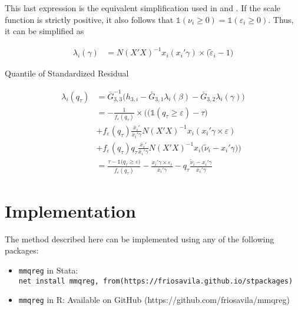 \documentclass[
  authoryear,
  review,
  1p]{elsarticle}
\providecommand{\tightlist}{%
  \setlength{\itemsep}{0pt}\setlength{\parskip}{0pt}}\usepackage{longtable,booktabs,array}
\begin{document}
This last expression is the equivalent simplification used in
\citet{mss2019} and \citet{im2000}. If the scale function is strictly
positive, it also follows that
\(\mathbb{1}(\nu_i \geq 0)= \mathbb{1}(\varepsilon_i \geq 0)\). Thus, it
can be simplified as

\[\begin{aligned}
\lambda_i(\gamma) &= N(X'X)^{-1} x_i ( x_i' \gamma ) \times (\tilde \varepsilon_i -1\big)
\end{aligned}
\]

Quantile of Standardized Residual

\[\begin{aligned}
\lambda_i(q_\tau)&=\bar G_{3,3}^{-1}
\Big(
 h_{3,i}-\bar G_{3,1} \lambda_i(\beta)-\bar G_{3,2} \lambda_i(\gamma)
\Big) \\
&=-\frac{1}{f_{\varepsilon}(q_\tau)} \times \Bigg( \Big(\mathbb{1} ( q_\tau  \geq \varepsilon  ) - \tau \Big)  \\
&+ f_{\varepsilon} (q_\tau) \frac{\bar x_i'}{\bar x_i'\gamma} 
N (X'X)^{-1} x_i  ( x_i'\gamma \times \varepsilon) \\
&+ f_{\varepsilon}(q_\tau) q_\tau \frac{\bar x_i'}{\bar x_i'\gamma} N(X'X)^{-1} x_i   \big( \tilde \nu_i -x_i' 
  \gamma \big) 
\Bigg) \\
&=\frac{\tau-\mathbb{1}\big( q_\tau  \geq \varepsilon  \big) }{f_{\varepsilon}(q_\tau)}
- \frac{ x_i'\gamma \times \varepsilon_i }{\bar x_i'\gamma} 
-  q_\tau \frac{ \tilde \nu_i -x_i' 
  \gamma }{\bar x_i'\gamma} 
\end{aligned}
\]

\section{Implementation}\label{implementation}

The method described here can be implemented using any of the following
packages:

\begin{itemize}
\tightlist
\item
  \texttt{mmqreg} in Stata:
  \texttt{net\ install\ mmqreg,\ from(https://friosavila.github.io/stpackages)}
\item
  \texttt{mmqreg} in R: Available on GitHub
  (https://github.com/friosavila/mmqreg)
\end{itemize}
\end{document}
